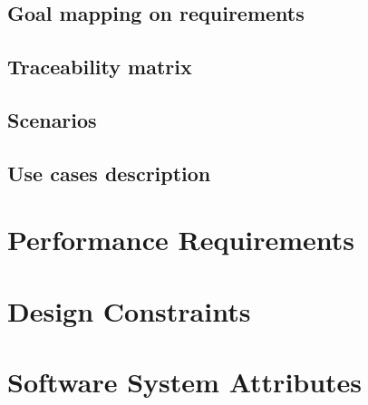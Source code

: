     \subsection{Goal mapping on requirements}

    \subsection{Traceability matrix}

    \subsection{Scenarios}

    \subsection{Use cases description}

\section{Performance Requirements}

\section{Design Constraints}

\section{Software System Attributes}
